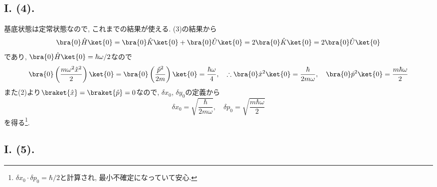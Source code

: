 \subsection*{I. (4). }
基底状態は定常状態なので, これまでの結果が使える. 
(3)の結果から
\begin{equation}
  \bra{0}\hat{H}\ket{0}=\bra{0}\hat{K}\ket{0}+\bra{0}\hat{U}\ket{0}=2\bra{0}\hat{K}\ket{0}=2\bra{0}\hat{U}\ket{0}
\end{equation}
であり, $\bra{0}\hat{H}\ket{0}=\hbar\omega/2$なので
\begin{equation}
  \bra{0}\left( \frac{m\omega^2\hat{x}^2}{2} \right)\ket{0}=\bra{0}\left( \frac{\hat{p}^2}{2m} \right)\ket{0}=\frac{\hbar\omega}{4}, \quad\therefore \bra{0}\hat{x}^2\ket{0}=\frac{\hbar}{2m\omega}, \quad \bra{0}\hat{p}^2\ket{0}=\frac{m\hbar\omega}{2}
\end{equation}
また(2)より$\braket{\hat{x}}=\braket{\hat{p}}=0$なので, $\delta x_0$, $\delta y_0$の定義から
\begin{equation}
  \delta x_0=\sqrt{\frac{\hbar}{2m\omega}}, \quad \delta p_0=\sqrt{\frac{m\hbar\omega}{2}}
\end{equation}
を得る\footnote{$\delta x_0\cdot\delta p_0=\hbar/2$と計算され, 最小不確定になっていて安心. }. 

\subsection*{I. (5).}


